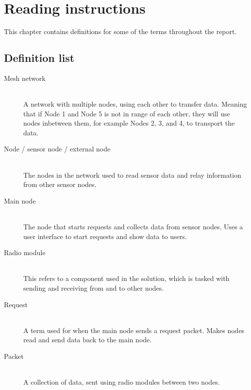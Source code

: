 \chapter{Reading instructions}

This chapter contains definitions for some of the terms throughout the report.

\section*{Definition list}

\begin{description}
\item[Mesh network] \hfill \\
A network with multiple nodes, using each other to transfer data. Meaning that if Node 1 and Node 5 is not in range of each other, they will use nodes inbetween them, for example Nodes 2, 3, and 4, to transport the data.

\item[Node / sensor node / external node] \hfill \\
The nodes in the network used to read sensor data and relay information from other sensor nodes.

\item[Main node] \hfill \\
The node that starts requests and collects data from sensor nodes. Uses a user interface to start requests and show data to users.

\item[Radio module] \hfill \\
This refers to a component used in the solution, which is tasked with sending and receiving from and to other nodes.

\item[Request] \hfill \\
A term used for when the main node sends a request packet. Makes nodes read and send data back to the main node.

\item[Packet] \hfill \\
A collection of data, sent using radio modules between two nodes.

\end{description}
